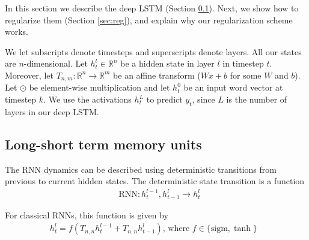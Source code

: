 \documentclass{article} %
\begin{document}
	In this section we describe the deep LSTM (Section \ref{sec:lstm}). Next, 
	we show how to regularize them (Section \ref{sec:reg}), and explain
	why our regularization scheme works.
	
	We let subscripts denote timesteps and superscripts denote 
	layers.  All our states are $n$-dimensional.  Let $h^l_t
	\in \mathbb{R}^{n}$ be a hidden state in layer $l$ in timestep
	$t$. Moreover, let $T_{n,m}:\mathbb{R}^{n} \rightarrow \mathbb{R}^{m}$
	be an affine transform ($Wx + b$ for some $W$ and $b$).
	Let $\odot$ be element-wise multiplication and let $h^0_t$ be an
	input word vector at timestep $k$.  We use the activations $h^{L}_t$ to predict $y_t$,
	since $L$ is the number of layers in our deep LSTM.
	
	\subsection{Long-short term memory units}
	\label{sec:lstm}
	
	The RNN dynamics can be described using deterministic transitions
	from previous to current hidden states. 
	The deterministic state transition is a function
	\begin{align*}
	&\text{RNN} : h^{l-1}_t, h^l_{t-1} \rightarrow h^l_t
	\end{align*}
	
	For classical RNNs, this function is given by
	\begin{align*}
	h^l_t = f(T_{n,n}h^{l-1}_t + T_{n,n}h^l_{t-1}) \text{, where $f \in \{\mathrm{sigm}, \tanh\}$ }
	\end{align*}
	
\end{document}
